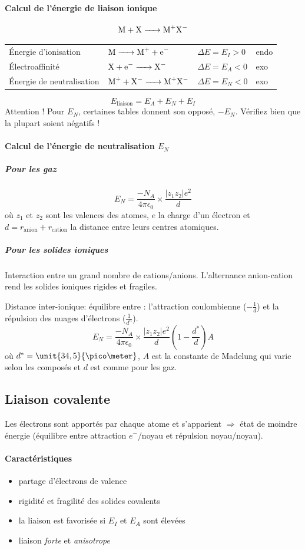 \documentclass[11pt,a4paper,french]{article}
\begin{document}
\paragraph{Calcul de l'énergie de liaison ionique}
\[ \ce{M + X -> M+X-} \]
\begin{center}
	\begin{tabular}{llll}
		\'Energie d'ionisation & $\ce{M -> M+ + e-}$ & $\Delta E = E_I > 0$ & endo\\
		\'Electroaffinité & $\ce{X + e- -> X-}$ & $\Delta E = E_A < 0$ & exo\\
		\'Energie de neutralisation & $\ce{M+ + X- -> M+X-}$ & $\Delta E = E_N < 0$ & exo
	\end{tabular}
\end{center}
\[ E_{\mathrm{liaison}} = E_A + E_N + E_I \]
Attention !
Pour $E_N$, certaines tables donnent son opposé, $-E_N$.
Vérifiez bien que la plupart soient négatifs !

\paragraph{Calcul de l'énergie de neutralisation $E_N$}

\subparagraph{Pour les gaz}
\[ E_N = \frac{-N_A}{4\pi\epsilon_0}\times\frac{|z_1z_2|e^2}{d} \]
où $z_1$ et $z_2$ sont les valences des atomes, $e$ la charge d'un électron et $d = r_{\mathrm{anion}} + r_{\mathrm{cation}}$ la distance entre leurs centres atomiques.
\subparagraph{Pour les solides ioniques}
Interaction entre un grand nombre de cations/anions.
L'alternance anion-cation rend les solides ioniques rigides et fragiles.

Distance inter-ionique: équilibre entre : l'attraction coulombienne ($-\frac{1}{d}$) et la répulsion des nuages d'électrons ($\frac{1}{d^n}$).
\[ E_N = \frac{-N_A}{4\pi\epsilon_0}\times\frac{|z_1z_2|e^2}{d} \left(1-\frac{d^*}{d}\right)A \]
où $d^* = \unit{34,5}{\pico\meter}$, $A$ est la constante de Madelung qui varie selon les composés et $d$ est comme pour les gaz.

\subsection{Liaison covalente}

Les électrons sont apportés par chaque atome et s'apparient $\Rightarrow$ état de moindre énergie (équilibre entre attraction $e^-$/noyau et répulsion noyau/noyau).

\paragraph{Caractéristiques}
\begin{itemize}
	\item partage d'électrons de valence
	\item rigidité et fragilité des solides covalents
	\item la liaison est favorisée si $E_I$ et $E_A$ sont élevées
	\item liaison \emph{forte} et \emph{anisotrope}
\end{itemize}
\end{document}
